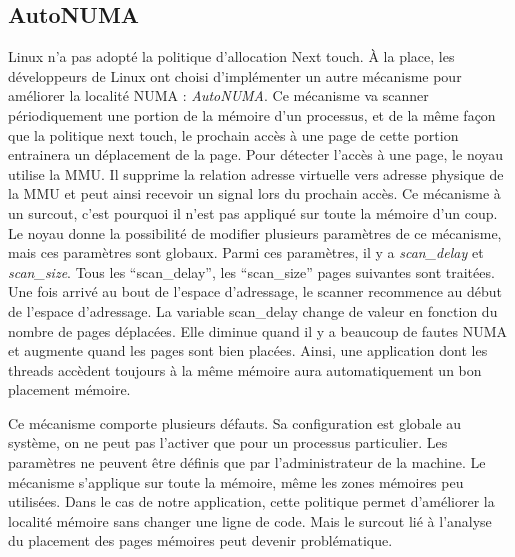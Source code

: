\subsection{AutoNUMA}
\label{sec:autonuma}
Linux n'a pas adopté la politique d'allocation Next touch.
\`A la place, les développeurs de Linux ont choisi d'implémenter un autre mécanisme pour améliorer la localité NUMA : {\em AutoNUMA}.
Ce mécanisme va scanner périodiquement une portion de la mémoire d'un processus, et de la même façon que la politique next touch, le prochain accès à une page de cette portion entrainera un déplacement de la page.
%
Pour détecter l'accès à une page, le noyau utilise la MMU.
%
Il supprime la relation adresse virtuelle vers adresse physique de la MMU et peut ainsi recevoir un signal lors du prochain accès.
%
Ce mécanisme à un surcout, c'est pourquoi il n'est pas appliqué sur toute la mémoire d'un coup.
%
Le noyau donne la possibilité de modifier plusieurs paramètres de ce mécanisme, mais ces paramètres sont globaux.
%
Parmi ces paramètres, il y a {\em scan\_delay} et {\em scan\_size}.
%
Tous les ``scan\_delay'', les ``scan\_size'' pages suivantes sont traitées.
%
Une fois arrivé au bout de l'espace d'adressage, le scanner recommence au début de l'espace d'adressage.
%
La variable scan\_delay change de valeur en fonction du nombre de pages déplacées.
%
Elle diminue quand il y a beaucoup de fautes NUMA et augmente quand les pages sont bien placées.
%
Ainsi, une application dont les threads accèdent toujours à la même mémoire aura automatiquement un bon placement mémoire.


Ce mécanisme comporte plusieurs défauts.
%
Sa configuration est globale au système, on ne peut pas l'activer que pour un processus particulier.
%
Les paramètres ne peuvent être définis que par l'administrateur de la machine.
%
Le mécanisme s'applique sur toute la mémoire, même les zones mémoires peu utilisées.
%
Dans le cas de notre application, cette politique permet d'améliorer la localité mémoire sans changer une ligne de code.
%
Mais le surcout lié à l'analyse du placement des pages mémoires peut devenir problématique.

